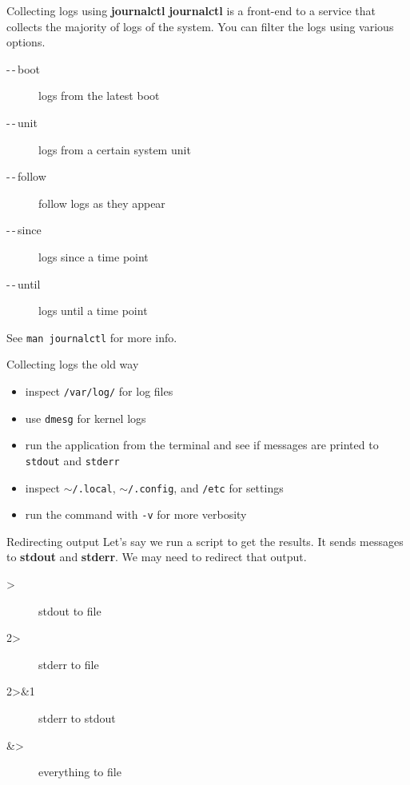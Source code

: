 \documentclass[12pt]{beamer}
\begin{document}
\begin{frame}[fragile]{Collecting logs using \textbf{journalctl}}
\textbf{journalctl} is a front-end to a service that collects the majority of logs of the system. You can filter the logs using various options.

\begin{description}
	\item[-\,-\,boot] logs from the latest boot
	\item[-\,-\,unit] logs from a certain system unit
	\item[-\,-\,follow] follow logs as they appear
	\item[-\,-\,since] logs since a time point
	\item[-\,-\,until] logs until a time point
\end{description}

\vspace{5pt}

See {\color{blue}\texttt{man journalctl}} for more info.
\end{frame}

\begin{frame}{Collecting logs the old way}
\begin{itemize}
	\item inspect {\color{blue} \texttt{/var/log/}} for log files 
	\item use {\color{blue} \texttt{dmesg}} for kernel logs 
	\item run the application from the terminal and see if messages are printed to {\color{blue}\texttt{stdout}} and {\color{blue}\texttt{stderr}}
	\item inspect {\color{blue} \texttt{$\sim$/.local}}, {\color{blue} \texttt{$\sim$/.config}}, and {\color{blue} \texttt{/etc}} for settings 
	\item run the command with {\color{blue} \texttt{-v}} for more verbosity
\end{itemize}	
\end{frame}

\begin{frame}{Redirecting output}
Let's say we run a script to get the results. It sends messages to \textbf{stdout} and \textbf{stderr}. We may need to redirect that output.
\begin{description}
	\item[>] stdout to file
	\item[2>] stderr to file
	\item[2>\&1] stderr to stdout
	\item[\&>] everything to file
\end{description}
\end{frame}
\end{document}
